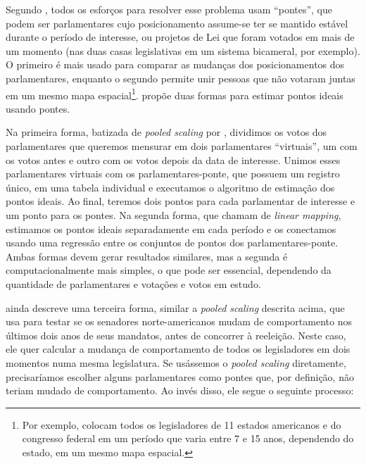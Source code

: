 \documentclass[a4paper,titlepage]{ppgi}\usepackage[]{graphicx}\usepackage[]{color}
\begin{document}
Segundo , todos os esforços para resolver esse problema
usam ``pontes'', que podem ser parlamentares cujo posicionamento assume-se ter
se mantido estável durante o período de interesse, ou projetos de Lei que
foram votados em mais de um momento (nas duas casas legislativas em um sistema
bicameral, por exemplo). O primeiro é mais usado para comparar as mudanças dos
posicionamentos dos parlamentares, enquanto o segundo permite unir pessoas que
não votaram juntas em um mesmo mapa espacial\footnote{Por exemplo,
 colocam todos os legisladores de 11 estados americanos e
do congresso federal em um período que varia entre 7 e 15 anos, dependendo do
estado, em um mesmo mapa espacial.}.  propõe duas formas
para estimar pontos ideais usando pontes.

Na primeira forma, batizada de \emph{pooled scaling} por ,
dividimos os votos dos parlamentares que queremos mensurar em dois
parlamentares ``virtuais'', um com os votos antes e outro com os votos depois
da data de interesse. Unimos esses parlamentares virtuais com os
parlamentares-ponte, que possuem um registro único, em uma tabela individual e
executamos o algoritmo de estimação dos pontos ideais. Ao final, teremos dois
pontos para cada parlamentar de interesse e um ponto para os pontes. Na
segunda forma, que  chamam de \emph{linear mapping},
estimamos os pontos ideais separadamente em cada período e os conectamos usando
uma regressão entre os conjuntos de pontos dos parlamentares-ponte. Ambas
formas devem gerar resultados similares, mas a segunda é computacionalmente
mais simples, o que pode ser essencial, dependendo da quantidade de
parlamentares e votações e votos em estudo.

 ainda descreve uma terceira forma, similar a
\emph{pooled scaling} descrita acima, que usa para testar se os senadores
norte-americanos mudam de comportamento nos últimos dois anos de seus mandatos,
antes de concorrer à reeleição. Neste caso, ele quer calcular a mudança de
comportamento de todos os legisladores em dois momentos numa mesma legislatura.
Se usássemos o \emph{pooled scaling} diretamente, precisaríamos escolher alguns
parlamentares como pontes que, por definição, não teriam mudado de
comportamento. Ao invés disso, ele segue o seguinte processo:
\end{document}
